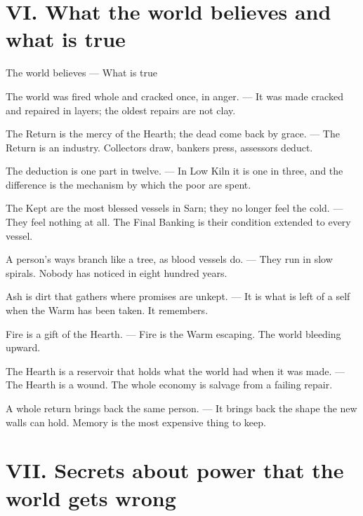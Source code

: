 \documentclass{design/chronicle}
\begin{document}
\section*{VI. What the world believes and what is true}

The world believes — What is true\par

The world was fired whole and cracked once, in anger. — It was made cracked and repaired in layers; the oldest repairs are not clay.\par

The Return is the mercy of the Hearth; the dead come back by grace. — The Return is an industry. Collectors draw, bankers press, assessors deduct.\par

The deduction is one part in twelve. — In Low Kiln it is one in three, and the difference is the mechanism by which the poor are spent.\par

The Kept are the most blessed vessels in Sarn; they no longer feel the cold. — They feel nothing at all. The Final Banking is their condition extended to every vessel.\par

A person’s ways branch like a tree, as blood vessels do. — They run in slow spirals. Nobody has noticed in eight hundred years.\par

Ash is dirt that gathers where promises are unkept. — It is what is left of a self when the Warm has been taken. It remembers.\par

Fire is a gift of the Hearth. — Fire is the Warm escaping. The world bleeding upward.\par

The Hearth is a reservoir that holds what the world had when it was made. — The Hearth is a wound. The whole economy is salvage from a failing repair.\par

A whole return brings back the same person. — It brings back the shape the new walls can hold. Memory is the most expensive thing to keep.\par

\section*{VII. Secrets about power that the world gets wrong}
\end{document}

